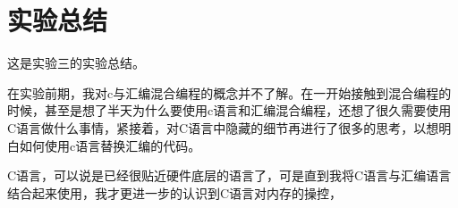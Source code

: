 \documentclass[forprint]{WHUBachelor}
\begin{document}
\chapter{实验总结}

这是实验三的实验总结。

在实验前期，我对c与汇编混合编程的概念并不了解。在一开始接触到混合编程的时候，甚至是想了半天为什么要使用c语言和汇编混合编程，还想了很久需要使用C语言做什么事情，紧接着，对C语言中隐藏的细节再进行了很多的思考，以想明白如何使用c语言替换汇编的代码。

C语言，可以说是已经很贴近硬件底层的语言了，可是直到我将C语言与汇编语言结合起来使用，我才更进一步的认识到C语言对内存的操控，







% 










\appendix
\end{document}
